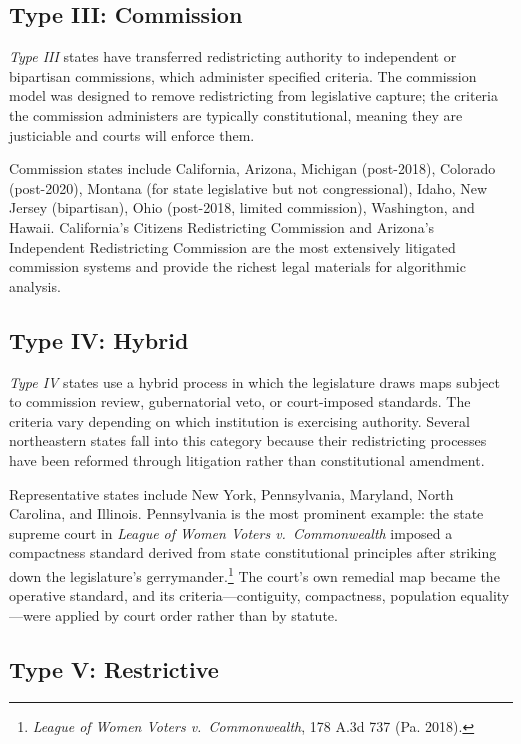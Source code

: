 \subsection{Type III: Commission}

\textit{Type III} states have transferred redistricting authority to independent or bipartisan commissions, which administer specified criteria. The commission model was designed to remove redistricting from legislative capture; the criteria the commission administers are typically constitutional, meaning they are justiciable and courts will enforce them.

Commission states include California, Arizona, Michigan (post-2018), Colorado (post-2020), Montana (for state legislative but not congressional), Idaho, New Jersey (bipartisan), Ohio (post-2018, limited commission), Washington, and Hawaii. California's Citizens Redistricting Commission and Arizona's Independent Redistricting Commission are the most extensively litigated commission systems and provide the richest legal materials for algorithmic analysis.

\subsection{Type IV: Hybrid}

\textit{Type IV} states use a hybrid process in which the legislature draws maps subject to commission review, gubernatorial veto, or court-imposed standards. The criteria vary depending on which institution is exercising authority. Several northeastern states fall into this category because their redistricting processes have been reformed through litigation rather than constitutional amendment.

Representative states include New York, Pennsylvania, Maryland, North Carolina, and Illinois. Pennsylvania is the most prominent example: the state supreme court in \textit{League of Women Voters v.\ Commonwealth} imposed a compactness standard derived from state constitutional principles after striking down the legislature's gerrymander.\footnote{\textit{League of Women Voters v.\ Commonwealth}, 178 A.3d 737 (Pa. 2018).} The court's own remedial map became the operative standard, and its criteria---contiguity, compactness, population equality---were applied by court order rather than by statute.

\subsection{Type V: Restrictive}

